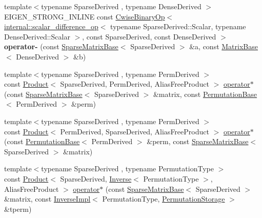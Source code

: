 \begin{DoxyCompactItemize}
\item 
\mbox{\label{namespace_eigen_adf0e9baaa399fee960a24eeac893e861}} 
{\footnotesize template$<$typename Sparse\+Derived , typename Dense\+Derived $>$ }\\E\+I\+G\+E\+N\+\_\+\+S\+T\+R\+O\+N\+G\+\_\+\+I\+N\+L\+I\+NE const \hyperlink{group___core___module_class_eigen_1_1_cwise_binary_op}{Cwise\+Binary\+Op}$<$ \hyperlink{struct_eigen_1_1internal_1_1scalar__difference__op}{internal\+::scalar\+\_\+difference\+\_\+op}$<$ typename Sparse\+Derived\+::\+Scalar, typename Dense\+Derived\+::\+Scalar $>$, const Sparse\+Derived, const Dense\+Derived $>$ {\bfseries operator-\/} (const \hyperlink{group___sparse_core___module_class_eigen_1_1_sparse_matrix_base}{Sparse\+Matrix\+Base}$<$ Sparse\+Derived $>$ \&a, const \hyperlink{group___core___module_class_eigen_1_1_matrix_base}{Matrix\+Base}$<$ Dense\+Derived $>$ \&b)
\item 
{\footnotesize template$<$typename Sparse\+Derived , typename Perm\+Derived $>$ }\\const \hyperlink{group___core___module_class_eigen_1_1_product}{Product}$<$ Sparse\+Derived, Perm\+Derived, Alias\+Free\+Product $>$ \hyperlink{namespace_eigen_ad798a8be8b0c5f94a29b119898d8d83d}{operator$\ast$} (const \hyperlink{group___sparse_core___module_class_eigen_1_1_sparse_matrix_base}{Sparse\+Matrix\+Base}$<$ Sparse\+Derived $>$ \&matrix, const \hyperlink{group___core___module_class_eigen_1_1_permutation_base}{Permutation\+Base}$<$ Perm\+Derived $>$ \&perm)
\item 
{\footnotesize template$<$typename Sparse\+Derived , typename Perm\+Derived $>$ }\\const \hyperlink{group___core___module_class_eigen_1_1_product}{Product}$<$ Perm\+Derived, Sparse\+Derived, Alias\+Free\+Product $>$ \hyperlink{namespace_eigen_a9c2c1af8da495ae3cbe7be12cecfe294}{operator$\ast$} (const \hyperlink{group___core___module_class_eigen_1_1_permutation_base}{Permutation\+Base}$<$ Perm\+Derived $>$ \&perm, const \hyperlink{group___sparse_core___module_class_eigen_1_1_sparse_matrix_base}{Sparse\+Matrix\+Base}$<$ Sparse\+Derived $>$ \&matrix)
\item 
{\footnotesize template$<$typename Sparse\+Derived , typename Permutation\+Type $>$ }\\const \hyperlink{group___core___module_class_eigen_1_1_product}{Product}$<$ Sparse\+Derived, \hyperlink{class_eigen_1_1_inverse}{Inverse}$<$ Permutation\+Type $>$, Alias\+Free\+Product $>$ \hyperlink{namespace_eigen_ad6d3d00588ad602b9d64755ab14ac2f0}{operator$\ast$} (const \hyperlink{group___sparse_core___module_class_eigen_1_1_sparse_matrix_base}{Sparse\+Matrix\+Base}$<$ Sparse\+Derived $>$ \&matrix, const \hyperlink{class_eigen_1_1_inverse_impl}{Inverse\+Impl}$<$ Permutation\+Type, \hyperlink{struct_eigen_1_1_permutation_storage}{Permutation\+Storage} $>$ \&tperm)

\end{DoxyCompactItemize}
